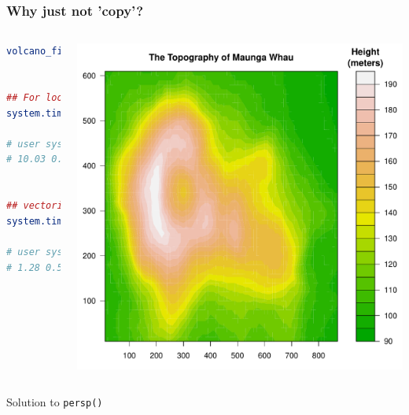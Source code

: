 \documentclass{beamer}
\begin{document}
\begin{frame}[fragile]
\frametitle{Why just not 'copy'?}

\begin{columns}[c]
\begin{lstlisting}[language = R]
volcano_filled.contour()


## For loop 
system.time(grid.echo())

# user system elapsed
# 10.03 0.23 10.32


## vectorizetion
system.time(grid.echo())

# user system elapsed
# 1.28 0.53 1.82
\end{lstlisting}

\begin{center}
\includegraphics{plot/filled_example_1}
\end{center}

\end{columns}
\end{frame}



\begin{frame}[fragile]
\begin{center}
  \Huge Solution to \texttt{persp()}
\end{center}
\end{frame}
\end{document}
